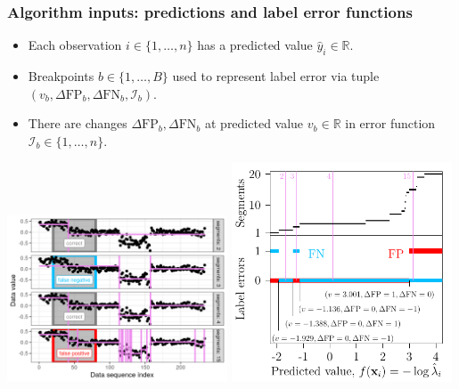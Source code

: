 \documentclass{beamer}
\begin{document}
\begin{frame}
  \frametitle{Algorithm inputs: predictions and label error functions}

  \begin{itemize}
  \item Each observation $i\in\{1,\dots,n\}$ has a predicted value
    $\hat y_i\in\mathbb R$.
  \item Breakpoints
  $b\in\{1,\dots, B\}$ used to represent label error via tuple
  $(v_b, \Delta\text{FP}_b, \Delta\text{FN}_b, \mathcal I_b)$.
\item There are changes $\Delta\text{FP}_b, \Delta\text{FN}_b$ at
  predicted value $v_b\in\mathbb R$ in error function
  $\mathcal I_b\in\{1,\dots,n\}$.
  \end{itemize}

  \includegraphics[width=0.49\textwidth]{figure-fn-not-monotonic}
  \includegraphics[width=0.49\textwidth]{figure-fn-not-monotonic-error-standAlone}

\end{frame}
\end{document}
